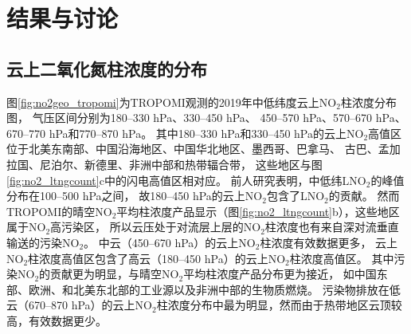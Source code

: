 


\section{结果与讨论}

\subsection{云上二氧化氮柱浓度的分布} \label{sec:no2_vcd_cld}

图\ref{fig:no2geo_tropomi}为TROPOMI观测的2019年中低纬度云上NO$_2$柱浓度分布图，
气压区间分别为180--330 hPa、330--450 hPa、
450--570 hPa、570--670 hPa、670--770 hPa和770--870 hPa。
其中180--330 hPa和330--450 hPa的云上NO$_2$高值区位于北美东南部、中国沿海地区、中国华北地区、墨西哥、巴拿马、
古巴、孟加拉国、尼泊尔、新德里、非洲中部和热带辐合带，
这些地区与图\ref{fig:no2_ltngcount}c中的闪电高值区相对应。
前人研究表明，中低纬LNO$_2$的峰值分布在100--500 hPa之间\citep{Pickering.1988,Ott.2010,Luo.2017}，
故180--450 hPa的云上NO$_2$包含了LNO$_2$的贡献。
然而TROPOMI的晴空NO$_2$平均柱浓度产品显示（图\ref{fig:no2_ltngcount}b），这些地区属于NO$_2$高污染区，
所以云压处于对流层上层的NO$_2$柱浓度也有来自深对流垂直输送的污染NO$_2$。
中云（450--670 hPa）的云上NO$_2$柱浓度有效数据更多，
云上NO$_2$柱浓度高值区包含了高云（180--450 hPa）的云上NO$_2$柱浓度高值区。
其中污染NO$_2$的贡献更为明显，与晴空NO$_2$平均柱浓度产品分布更为接近，
如中国东部、欧洲、和北美东北部的工业源以及非洲中部的生物质燃烧。
污染物排放在低云（670--870 hPa）的云上NO$_2$柱浓度分布中最为明显，然而由于热带地区云顶较高，有效数据更少。


